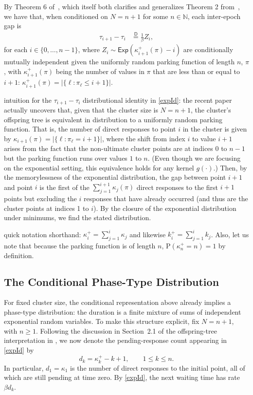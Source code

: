 \documentclass[stsy,dblanonrev]{amers/INFORMS-STSY-Template-26-02-2026/informs4}
\newcommand{\PP}[1]{\mathrm{P}\left(#1\right)}
\begin{document}
By Theorem 6 of~\citet{daw2024asymmetries}, which itself both clarifies and generalizes Theorem 2 from~\citet{daw2023conditional}, we have that, when conditioned on $N=n+1$ for some $n \in \mathbb{N}$,  each inter-epoch gap is 
\begin{align}
\tau_{i+1} - \tau_{i}
&\stackrel{\mathsf{D}}{=}
\frac{1}{\beta} Z_i
,
\label{expId}
\end{align}
for each $i \in \{0, \dots, n-1\}$, where $Z_i \sim \mathsf{Exp}\left(\kappa_{i+1}^+(\pi) - i\right)$ are conditionally mutually independent given the uniformly random parking function of length $n$, $\pi$, with $\kappa_{i+1}^+(\pi)$ being the number of values in $\pi$ that are less than or equal to $i+1$: $\kappa_{i+1}^+(\pi) = |\{\ell : \pi_\ell \leq i+1\}|$.



intuition for the $\tau_{i+1} - \tau_{i}$ distributional identity in \eqref{expId}: the recent paper \citet{daw2024asymmetries} actually uncovers that, given that the cluster size is $N=n+1$, the cluster's offspring tree is equivalent in distribution to a uniformly random parking function. That is, the number of direct responses to point $i$ in the cluster is given by $\kappa_{i+1}(\pi) = |\{\ell : \pi_\ell = i+1\}|$, where the shift from index $i$ to value $i+1$ arises from the fact that the non-ultimate cluster points are at indices 0 to $n-1$ but the parking function runs over values $1$ to $n$. (Even though we are focusing on the exponential setting, this equivalence holds for any kernel $g(\cdot)$.) Then, by the memorylessness of the exponential distribution, the gap between point $i+1$ and point $i$ is the first of the $\sum_{j=1}^{i+1} \kappa_j(\pi)$ direct responses to the first $i+1$ points but excluding the $i$ responses that have already occurred (and thus are the cluster points at indices 1 to $i$). By the closure of the exponential distribution under minimums, we find the stated distribution.

quick notation shorthand: $\kappa_{i}^+ = \sum_{j=1}^i \kappa_j$ and likewise $k_{i}^+ = \sum_{j=1}^i k_j$. Also, let us note that because the parking function is of length $n$, $\PP{\kappa_{n}^+ = n} = 1$ by definition.




\subsection{The Conditional Phase-Type Distribution}
For fixed cluster size, the conditional representation above already implies a phase-type distribution: the duration is a finite mixture of sums of independent exponential random variables. To make this structure explicit, fix $N=n+1$, with $n\geq1$. Following the discussion in Section~2.1 of the offspring-tree interpretation in \citet{daw2024asymmetries}, we now denote the pending-response count appearing in \eqref{expId} by
\begin{equation}
d_k=\kappa_k^+-k+1,\qquad 1\leq k\leq n.
\end{equation}
In particular, $d_1=\kappa_1$ is the number of direct responses to the initial point, all of which are still pending at time zero. By \eqref{expId}, the next waiting time has rate $\beta d_k$.
\end{document}
